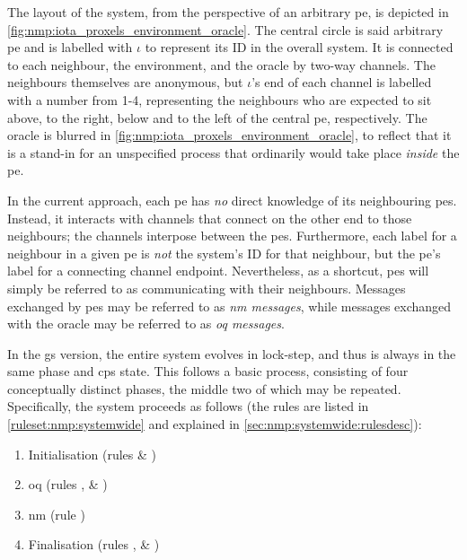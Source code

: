 The layout of the system, from the perspective of an arbitrary \gls{pe}, is depicted in \cref{fig:nmp:iota_proxels_environment_oracle}.  The central circle is said arbitrary \gls{pe} and is labelled with \(\iota\) to represent its ID in the overall system.  It is connected to each neighbour, the environment, and the oracle by two-way channels.  The neighbours themselves are anonymous, but \(\iota\)'s end of each channel is labelled with a number from 1-4, representing the neighbours who are expected to sit above, to the right, below and to the left of the central \gls{pe}, respectively.  The oracle is blurred in \cref{fig:nmp:iota_proxels_environment_oracle}, to reflect that it is a stand-in for an unspecified process that ordinarily would take place \emph{inside} the \gls{pe}.

In the current approach, each \gls{pe} has \emph{no} direct knowledge of its neighbouring \glspl{pe}.  Instead, it interacts with channels that connect on the other end to those neighbours; the channels interpose between the \glspl{pe}.  Furthermore, each label for a neighbour in a given \gls{pe} is \emph{not} the system's ID for that neighbour, but the \gls{pe}'s label for a connecting channel endpoint.  Nevertheless, as a shortcut, \glspl{pe} will simply be referred to as communicating with their neighbours.  Messages exchanged by \glspl{pe} may be referred to as \emph{\gls{nm} messages}, while messages exchanged with the oracle may be referred to as \emph{\gls{oq} messages}.

In the \gls{gs} version, the entire system evolves in lock-step, and thus is always in the same phase and \gls{cps} state.  This follows a basic process, consisting of four conceptually distinct phases, the middle two of which may be repeated.  Specifically, the system proceeds as follows (the rules are listed in \vref{ruleset:nmp:systemwide} and explained in \vref{sec:nmp:systemwide:rulesdesc}):

\begin{enumerate}
    \item\label{enumitem:nmp:init} Initialisation (rules  \& )
    \item\label{enumitem:nmp:pu} \Gls{oq} (rules ,  \& )
    \item\label{enumitem:nmp:nm} \Gls{nm} (rule )
    \item\label{enumitem:nmp:final} Finalisation (rules ,  \& )
\end{enumerate}

